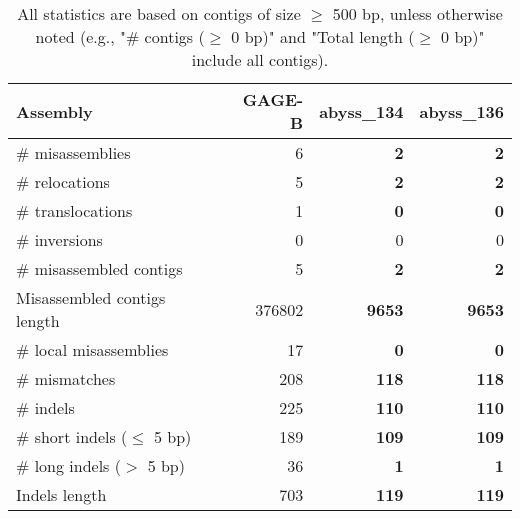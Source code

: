 \documentclass[12pt,a4paper]{article}
\begin{document}
\begin{table}[ht]
\begin{center}
\caption{All statistics are based on contigs of size $\geq$ 500 bp, unless otherwise noted (e.g., "\# contigs ($\geq$ 0 bp)" and "Total length ($\geq$ 0 bp)" include all contigs).}
\begin{tabular}{|l*{3}{|r}|}
\hline
Assembly & GAGE-B & abyss\_134 & abyss\_136 \\ \hline
\# misassemblies & 6 & {\bf 2} & {\bf 2} \\ \hline
\hspace{5mm}\# relocations & 5 & {\bf 2} & {\bf 2} \\ \hline
\hspace{5mm}\# translocations & 1 & {\bf 0} & {\bf 0} \\ \hline
\hspace{5mm}\# inversions & 0 & 0 & 0 \\ \hline
\# misassembled contigs & 5 & {\bf 2} & {\bf 2} \\ \hline
Misassembled contigs length & 376802 & {\bf 9653} & {\bf 9653} \\ \hline
\# local misassemblies & 17 & {\bf 0} & {\bf 0} \\ \hline
\# mismatches & 208 & {\bf 118} & {\bf 118} \\ \hline
\# indels & 225 & {\bf 110} & {\bf 110} \\ \hline
\hspace{5mm}\# short indels ($\leq$ 5 bp) & 189 & {\bf 109} & {\bf 109} \\ \hline
\hspace{5mm}\# long indels ($>$ 5 bp) & 36 & {\bf 1} & {\bf 1} \\ \hline
Indels length & 703 & {\bf 119} & {\bf 119} \\ \hline
\end{tabular}
\end{center}
\end{table}
\end{document}
